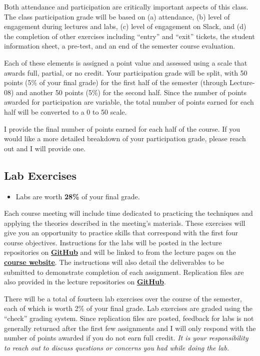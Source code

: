 \documentclass[
]{book}
\newenvironment{rmdblock}[1]
  {\begin{shaded*}
  \begin{itemize}
  \renewcommand{\labelitemi}{
    \raisebox{-.7\height}[0pt][0pt]{
      {\setkeys{Gin}{width=3em,keepaspectratio}\texttt{[image: images/\#1]}}
    }
  }
  \item
  }
  {
  \end{itemize}
  \end{shaded*}
  }
\newenvironment{rmdtip}
  {\begin{rmdblock}{tip}}
  {\end{rmdblock}}
\begin{document}
Both attendance and participation are critically important aspects of this class. The class participation grade will be based on (a) attendance, (b) level of engagement during lectures and labs, (c) level of engagement on Slack, and (d) the completion of other exercises including ``entry'' and ``exit'' tickets, the student information sheet, a pre-test, and an end of the semester course evaluation.

Each of these elements is assigned a point value and assessed using a scale that awards full, partial, or no credit. Your participation grade will be split, with 50 points (5\% of your final grade) for the first half of the semester (through Lecture-08) and another 50 points (5\%) for the second half. Since the number of points awarded for participation are variable, the total number of points earned for each half will be converted to a 0 to 50 scale.

I provide the final number of points earned for each half of the course. If you would like a more detailed breakdown of your participation grade, please reach out and I will provide one.

\hypertarget{lab-exercises}{%
\subsection{Lab Exercises}\label{lab-exercises}}

\begin{rmdtip}
Labs are worth \textbf{28\%} of your final grade.
\end{rmdtip}

Each course meeting will include time dedicated to practicing the techniques and applying the theories described in the meeting's materials. These exercises will give you an opportunity to practice skills that correspond with the first four course objectives. Instructions for the labs will be posted in the lecture repositories on \href{https://github.com/slu-soc5650}{\textbf{GitHub}} and will be linked to from the lecture pages on the \href{https://slu-soc5650.github.io/}{\textbf{course website}}. The instructions will also detail the deliverables to be submitted to demonstrate completion of each assignment. Replication files are also provided in the lecture repositories on \href{https://github.com/slu-soc5650}{\textbf{GitHub}}.

There will be a total of fourteen lab exercises over the course of the semester, each of which is worth 2\% of your final grade. Lab exercises are graded using the ``check'' grading system. Since replication files are posted, feedback for labs is not generally returned after the first few assignments and I will only respond with the number of points awarded if you do not earn full credit. \emph{It is your responsibility to reach out to discuss questions or concerns you had while doing the lab.}
\end{document}
